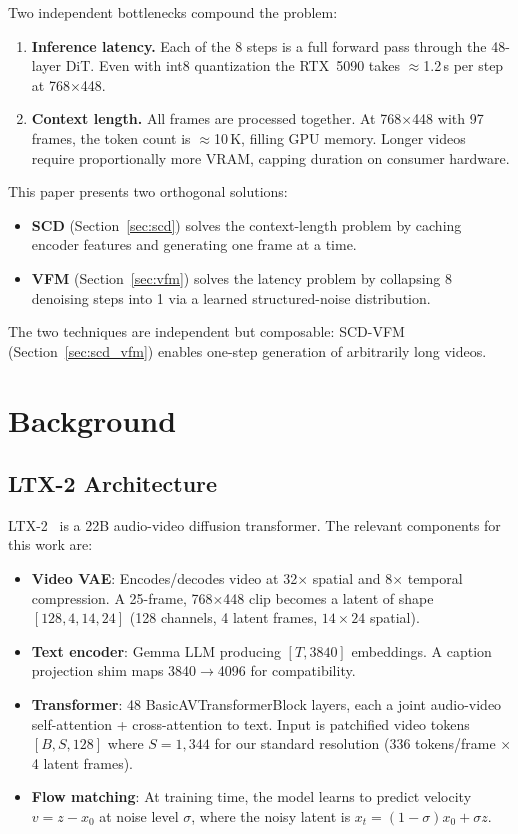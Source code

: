 \documentclass[10pt,twocolumn]{article}
\begin{document}
Two independent bottlenecks compound the problem:

\begin{enumerate}[nosep]
  \item \textbf{Inference latency.} Each of the 8 steps is a full forward pass through the 48-layer DiT. Even with int8 quantization the RTX~5090 takes $\approx$1.2\,s per step at 768$\times$448.
  \item \textbf{Context length.} All frames are processed together. At 768$\times$448 with 97 frames, the token count is $\approx$10\,K, filling GPU memory. Longer videos require proportionally more VRAM, capping duration on consumer hardware.
\end{enumerate}

This paper presents two orthogonal solutions:
\begin{itemize}[nosep]
  \item \textbf{SCD} (Section~\ref{sec:scd}) solves the context-length problem by caching encoder features and generating one frame at a time.
  \item \textbf{VFM} (Section~\ref{sec:vfm}) solves the latency problem by collapsing 8 denoising steps into 1 via a learned structured-noise distribution.
\end{itemize}

The two techniques are independent but composable: SCD-VFM (Section~\ref{sec:scd_vfm}) enables one-step generation of arbitrarily long videos.

\section{Background}
\label{sec:background}

\subsection{LTX-2 Architecture}

LTX-2~\cite{ltx2} is a 22B audio-video diffusion transformer. The relevant components for this work are:

\begin{itemize}[nosep]
  \item \textbf{Video VAE}: Encodes/decodes video at 32$\times$ spatial and 8$\times$ temporal compression. A 25-frame, 768$\times$448 clip becomes a latent of shape $[128, 4, 14, 24]$ (128 channels, 4 latent frames, $14\times 24$ spatial).
  \item \textbf{Text encoder}: Gemma LLM producing $[T, 3840]$ embeddings. A caption projection shim maps 3840$\to$4096 for compatibility.
  \item \textbf{Transformer}: 48 BasicAVTransformerBlock layers, each a joint audio-video self-attention + cross-attention to text. Input is patchified video tokens $[B, S, 128]$ where $S=1{,}344$ for our standard resolution (336 tokens/frame $\times$ 4 latent frames).
  \item \textbf{Flow matching}: At training time, the model learns to predict velocity $v = z - x_0$ at noise level $\sigma$, where the noisy latent is $x_t = (1-\sigma)x_0 + \sigma z$.
\end{itemize}
\end{document}
